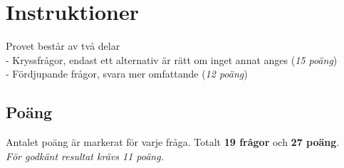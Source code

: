 \documentclass{exam}
\begin{document}
\section*{Instruktioner}
Provet består av två delar \\
    - Kryssfrågor, endast ett alternativ är rätt om inget annat anges (\textit{15 poäng})\\
    - Fördjupande frågor, svara mer omfattande (\textit{12 poäng})

\subsection*{Poäng}
Antalet poäng är markerat för varje fråga. Totalt \textbf{19 frågor} och \textbf{27 poäng}.\\ \textit{För godkänt resultat krävs 11 poäng.}

\vspace{5mm}
\begin{center}
\end{center}
\vspace{5mm}
\end{document}
